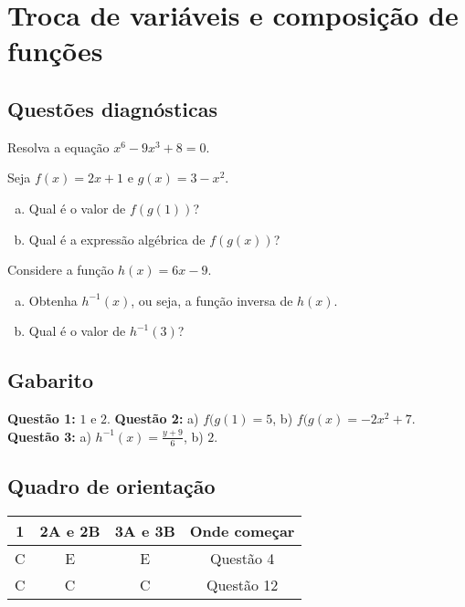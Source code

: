 \documentclass[main_estudante.tex]{subfiles}
\begin{document}
\chapter{Troca de variáveis e composição de funções}

\section{Questões diagnósticas}

\begin{diagnostico}
Resolva a equação $x^6-9x^3+8=0$.
\end{diagnostico}

\begin{diagnostico}
Seja $f(x)=2x+1$ e $g(x)=3-x^2$.
\begin{enumerate}[a)]
  \item Qual é o valor de $f(g(1))$?
  \item Qual é a expressão algébrica de $f(g(x))$?
\end{enumerate}
\end{diagnostico}

\begin{diagnostico}
Considere a função $h(x)=6x-9$.
\begin{enumerate}[a)]
  \item Obtenha $h^{-1}(x)$, ou seja, a função inversa de $h(x)$.
  \item Qual é o valor de $h^{-1}(3)$?
\end{enumerate}
\end{diagnostico}

\section{Gabarito}

\textbf{Questão 1:} $1$ e $2$. \textbf{Questão 2:} a) $f(g(1)=5$, b) $f(g(x)=-2x^2+7$. \textbf{Questão 3:} a) $h^{-1}(x)=\frac{y+9}{6}$, b) $2$.

\section{Quadro de orientação}

\begin{center}
 \begin{tabular}{|c c c |c|} 
 \hline
 1 & 2A e 2B & 3A e 3B & Onde começar\\
 \hline
 C & E & E & Questão 4 \\ 
 \hline
 C & C & C & Questão 12 \\ 
 \hline
\end{tabular}
\end{center}
\end{document}
